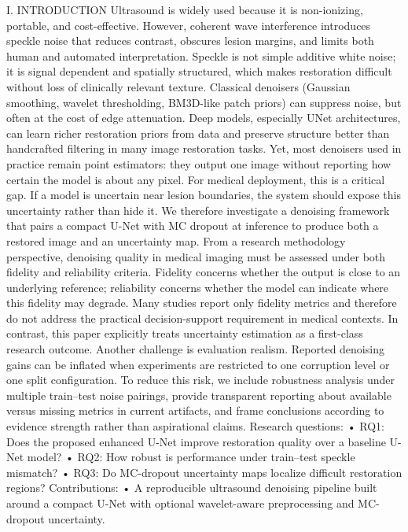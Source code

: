 
I. INTRODUCTION
Ultrasound is widely used because it is non-ionizing,
portable, and cost-effective. However, coherent wave interference introduces speckle noise that reduces contrast, obscures
lesion margins, and limits both human and automated interpretation. Speckle is not simple additive white noise; it is signal
dependent and spatially structured, which makes restoration
difficult without loss of clinically relevant texture.
Classical denoisers (Gaussian smoothing, wavelet thresholding, BM3D-like patch priors) can suppress noise, but often
at the cost of edge attenuation. Deep models, especially UNet architectures, can learn richer restoration priors from
data and preserve structure better than handcrafted filtering
in many image restoration tasks. Yet, most denoisers used
in practice remain point estimators: they output one image
without reporting how certain the model is about any pixel.
For medical deployment, this is a critical gap. If a model
is uncertain near lesion boundaries, the system should expose
this uncertainty rather than hide it. We therefore investigate
a denoising framework that pairs a compact U-Net with MC
dropout at inference to produce both a restored image and an
uncertainty map.
From a research methodology perspective, denoising quality
in medical imaging must be assessed under both fidelity and
reliability criteria. Fidelity concerns whether the output is close
to an underlying reference; reliability concerns whether the
model can indicate where this fidelity may degrade. Many
studies report only fidelity metrics and therefore do not address
the practical decision-support requirement in medical contexts.
In contrast, this paper explicitly treats uncertainty estimation
as a first-class research outcome.
Another challenge is evaluation realism. Reported denoising
gains can be inflated when experiments are restricted to one
corruption level or one split configuration. To reduce this risk,
we include robustness analysis under multiple train–test noise
pairings, provide transparent reporting about available versus
missing metrics in current artifacts, and frame conclusions
according to evidence strength rather than aspirational claims.
Research questions:
• RQ1: Does the proposed enhanced U-Net improve
restoration quality over a baseline U-Net model?
• RQ2: How robust is performance under train–test speckle
mismatch?
• RQ3: Do MC-dropout uncertainty maps localize difficult
restoration regions?
Contributions:
• A reproducible ultrasound denoising pipeline built around
a compact U-Net with optional wavelet-aware preprocessing and MC-dropout uncertainty.
